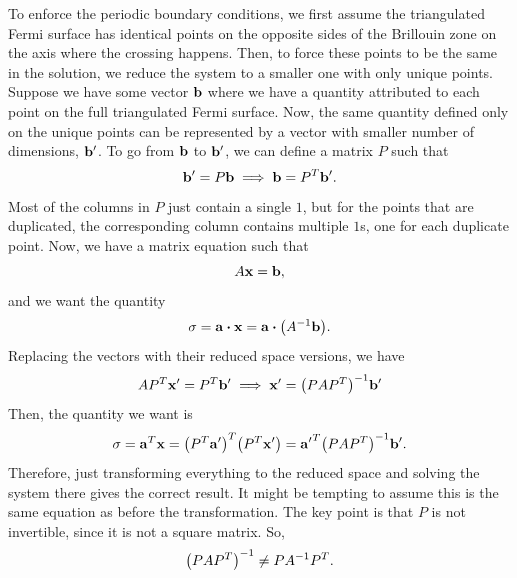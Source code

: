 \documentclass[12pt]{article}
\begin{document}
To enforce the periodic boundary conditions, we first assume the triangulated Fermi surface
has identical points on the opposite sides of the Brillouin zone on the axis where the crossing
happens. Then, to force these points to be the same in the solution, we reduce the system to
a smaller one with only unique points. Suppose we have some vector $\vb{b}$ where we have a
quantity attributed to each point on the full triangulated Fermi surface. Now, the same quantity
defined only on the unique points can be represented by a vector with smaller number of dimensions,
$\vb{b'}$. To go from $\vb{b}$ to $\vb{b'}$, we can define a matrix $P$ such that
\begin{equation}
    \vb{b'} = P\vb{b} \implies \vb{b} = P^T\vb{b'}.
\end{equation}
Most of the columns in $P$ just contain a single $1$, but for the points that are duplicated,
the corresponding column contains multiple $1$s, one for each duplicate point. Now, we have
a matrix equation such that
\begin{equation}
    A\vb{x} = \vb{b},
\end{equation}
and we want the quantity
\begin{equation}
    \sigma = \vb{a}\vdot\vb{x} = \vb{a}\vdot\qty(A^{-1}\vb{b}).
\end{equation}
Replacing the vectors with their reduced space versions, we have
\begin{equation}
    AP^T\vb{x'} = P^T\vb{b'} \implies \vb{x'} = \qty(P A P^T)^{-1} \vb{b'}
\end{equation}
Then, the quantity we want is
\begin{equation}
    \sigma = \vb{a}^T\vb{x} = \qty(P^T \vb{a'})^T \qty(P^T \vb{x'})
    = \vb{a'}^T \qty(P A P^T)^{-1} \vb{b'}.
\end{equation}
Therefore, just transforming everything to the reduced space and solving the system there gives
the correct result. It might be tempting to assume this is the same equation as before the
transformation. The key point is that $P$ is not invertible, since it is not a square matrix. So,
\begin{equation}
    \qty(P A P^T)^{-1} \neq P A^{-1} P^T.
\end{equation}
\end{document}
